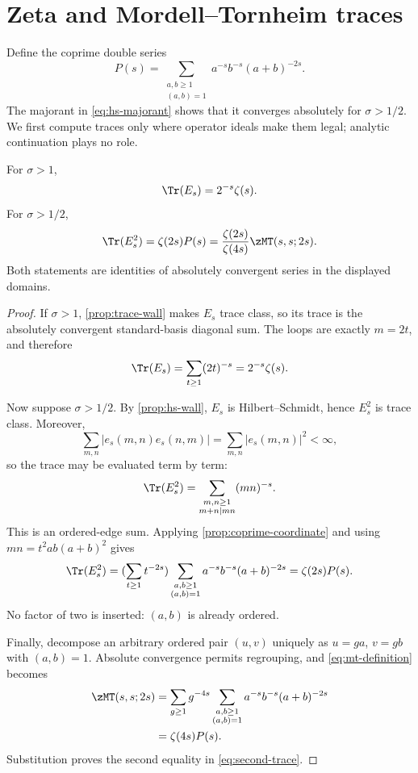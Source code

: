 \section{Zeta and Mordell--Tornheim traces}
\label{sec:traces-determinants}

Define the coprime double series
\begin{equation}
 P(s)=\sum_{\substack{a,b\geq1\\(a,b)=1}}
 a^{-s}b^{-s}(a+b)^{-2s}.
 \label{eq:primitive-P}
\end{equation}
The majorant in \eqref{eq:hs-majorant} shows that it converges absolutely
for $\sigma>1/2$.  We first compute traces only where operator ideals make
them legal; analytic continuation plays no role.

\begin{theorem}
\label{thm:two-traces}
For $\sigma>1$,
\begin{equation}
 \Tr(E_s)=2^{-s}\zeta(s).
 \label{eq:first-trace}
\end{equation}
For $\sigma>1/2$,
\begin{equation}
 \Tr(E_s^2)=\zeta(2s)P(s)
 =\frac{\zeta(2s)}{\zeta(4s)}\zMT(s,s;2s).
 \label{eq:second-trace}
\end{equation}
Both statements are identities of absolutely convergent series in the
displayed domains.
\end{theorem}

\begin{proof}
If $\sigma>1$, \cref{prop:trace-wall} makes $E_s$ trace class, so its trace
is the absolutely convergent standard-basis diagonal sum.  The loops are
exactly $m=2t$, and therefore
\[
 \Tr(E_s)=\sum_{t\geq1}(2t)^{-s}=2^{-s}\zeta(s).
\]

Now suppose $\sigma>1/2$.  By \cref{prop:hs-wall}, $E_s$ is
Hilbert--Schmidt, hence $E_s^2$ is trace class.  Moreover,
\[
 \sum_{m,n}|e_s(m,n)e_s(n,m)|
 =\sum_{m,n}|e_s(m,n)|^2<\infty,
\]
so the trace may be evaluated term by term:
\begin{equation}
 \Tr(E_s^2)
 =\sum_{\substack{m,n\geq1\\m+n\mid mn}}(mn)^{-s}.
 \label{eq:ordered-edge-trace}
\end{equation}
This is an ordered-edge sum.  Applying
\cref{prop:coprime-coordinate} and using
$mn=t^2ab(a+b)^2$ gives
\[
 \Tr(E_s^2)
 =(\sum_{t\geq1}t^{-2s})
  \sum_{\substack{a,b\geq1\\(a,b)=1}}
    a^{-s}b^{-s}(a+b)^{-2s}
 =\zeta(2s)P(s).
\]
No factor of two is inserted: $(a,b)$ is already ordered.

Finally, decompose an arbitrary ordered pair $(u,v)$ uniquely as
$u=ga$, $v=gb$ with $(a,b)=1$.  Absolute convergence permits regrouping,
and \eqref{eq:mt-definition} becomes
\begin{align*}
 \zMT(s,s;2s)
 &=\sum_{g\geq1}g^{-4s}
   \sum_{\substack{a,b\geq1\\(a,b)=1}}
     a^{-s}b^{-s}(a+b)^{-2s}\\
 &=\zeta(4s)P(s).
\end{align*}
Substitution proves the second equality in \eqref{eq:second-trace}.
\end{proof}

